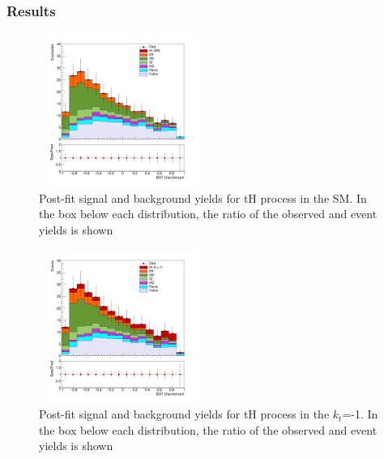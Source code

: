 \documentclass[11pt]{beamer}
\begin{document}
\begin{frame}
\frametitle{Results}
\begin{minipage}{0.4\textwidth}
	\begin{center}
	\begin{figure}
		\includegraphics[width=5.5cm,height=5cm]{figures/simple.png}
		\caption*{\tiny{Post-fit signal and background yields for tH process in the SM. In the
			box below each distribution, the ratio of the observed and  event yields is shown}}
	\end{figure}
\end{center}
\end{minipage}\hfill \quad
\begin{minipage}{0.4\textwidth}
	\begin{center}
	\begin{figure}
		\includegraphics[width=5.5cm,height=5cm]{figures/simple-kt-1.png}
		\caption*{\tiny{Post-fit signal and background yields for tH process in the $k_t$=-1. In the
			box below each distribution, the ratio of the observed and event yields is shown}}
	\end{figure}
\end{center}
\end{minipage}
\end{frame}
\end{document}

